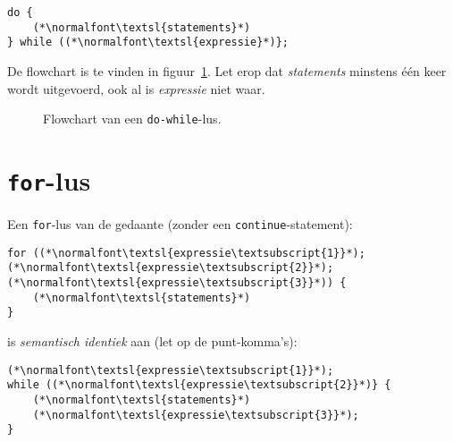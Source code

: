 \begin{lstlisting}[caption=Do-while-lus in C.]
do {
    (*\normalfont\textsl{statements}*)
} while ((*\normalfont\textsl{expressie}*)};
\end{lstlisting}

De flowchart is te vinden in figuur~\ref{fig:flodowhile}.
Let erop dat \textsl{statements} minstens \'e\'en keer wordt uitgevoerd, ook al is \textsl{expressie}
niet waar.

\begin{figure}[!ht]
\centering
{}
\caption{Flowchart van een \texttt{do-while}-lus.}
\label{fig:flodowhile}
\end{figure}


\newpage
\section{\texttt{for}-lus}

Een \texttt{for}-lus van de gedaante (zonder een \texttt{continue}-statement):
\newpage
\begin{lstlisting}[caption=\texttt{for}-lus in C.]
for ((*\normalfont\textsl{expressie\textsubscript{1}}*); (*\normalfont\textsl{expressie\textsubscript{2}}*); (*\normalfont\textsl{expressie\textsubscript{3}}*)) {
    (*\normalfont\textsl{statements}*)
}
\end{lstlisting}

is \textsl{semantisch identiek} aan (let op de punt-komma's):

\begin{lstlisting}[caption=\texttt{for}-lus herschreven als \texttt{while}-lus in C.]
(*\normalfont\textsl{expressie\textsubscript{1}}*);
while ((*\normalfont\textsl{expressie\textsubscript{2}}*)} {
    (*\normalfont\textsl{statements}*)
    (*\normalfont\textsl{expressie\textsubscript{3}}*);
}
\end{lstlisting}

